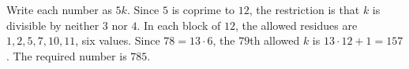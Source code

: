 Write each number as $5k$. Since $5$ is coprime to $12$, the restriction is that $k$ is divisible by neither $3$ nor $4$. In each block of $12$, the allowed residues are $1,2,5,7,10,11$, six values. Since $78=13\cdot6$, the $79$th allowed $k$ is $13\cdot12+1=157$. The required number is $\boxed{785}$.
